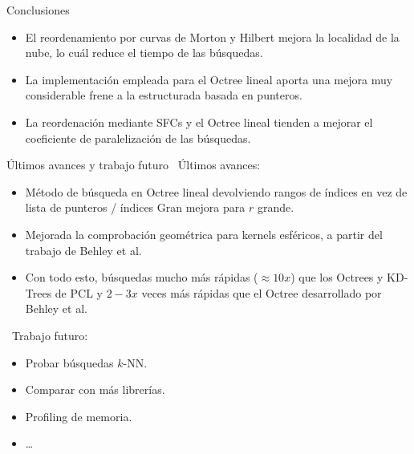 \documentclass[aspectratio=169]{beamer}
\begin{document}
\begin{frame}{Conclusiones}
    \begin{itemize}
        \item El reordenamiento por curvas de Morton y Hilbert mejora la localidad de la nube, lo cuál reduce el tiempo de las búsquedas.
        \item La implementación empleada para el Octree lineal aporta una mejora muy considerable frene a la estructurada basada en punteros.
        \item La reordenación mediante SFCs y el Octree lineal tienden a mejorar el coeficiente de paralelización de las búsquedas.
    \end{itemize}
\end{frame}

\begin{frame}{Últimos avances y trabajo futuro}
    \textrightarrow~Últimos avances:
    \begin{itemize}
        \item Método de búsqueda en Octree lineal devolviendo rangos de índices en vez de lista de punteros / índices \textrightarrow \: Gran mejora para $r$ grande.
        \item Mejorada la comprobación geométrica para kernels esféricos, a partir del trabajo de Behley et al. \cite{behley2015efficient}
        \item Con todo esto, búsquedas mucho más rápidas ($\approx 10x$) que los Octrees y KD-Trees de PCL y $2-3x$ veces más rápidas que el Octree desarrollado por Behley et al. \cite{behley2015efficient}
    \end{itemize}

    \textrightarrow~Trabajo futuro:

    \begin{itemize}
        \item Probar búsquedas $k$-NN.
        \item Comparar con más librerías.
        \item Profiling de memoria.
        \item \dots
    \end{itemize}
\end{frame}



\end{document}
